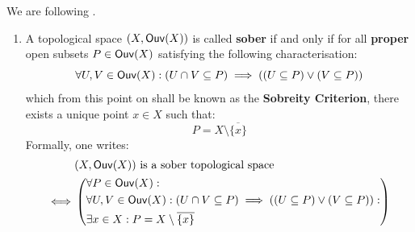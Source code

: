                     \begin{definition} \label{def: sober_spaces}
                        We are following \cite[Definition IX.3.2]{sheaves_in_geometry_and_logic}.
                        \begin{enumerate}
                            \item A topological space $(X, \mathsf{Ouv}(X))$ is called \textbf{sober} if and only if for all \textbf{proper} open subsets $P \in \mathsf{Ouv}(X)$ satisfying the following  characterisation:
                                $$\forall U, V \in \mathsf{Ouv}(X): (U \cap V \subseteq P) \implies \left((U \subseteq P) \vee (V \subseteq P)\right)$$
                            which from this point on shall be known as the \textbf{Sobreity Criterion}, there exists a unique point $x \in X$ such that:
                                $$P = X \setminus \overline{\{x\}}$$
                            Formally, one writes:
                                $$
                                    \begin{aligned}
                                        & \text{$(X, \mathsf{Ouv}(X))$ is a sober topological space}
                                        \\
                                        \iff &
                                            \left(\begin{aligned}
                                                & \forall P \in \mathsf{Ouv}(X):
                                                \\
                                                    & \forall U, V \in \mathsf{Ouv}(X): (U \cap V \subseteq P) \implies \left((U \subseteq P) \vee (V \subseteq P)\right): 
                                                \\
                                                & \exists x \in X: P = X \setminus \overline{\{x\}}
                                            \end{aligned}\right)
                                    \end{aligned}
                                $$
                        \end{enumerate}
                    \end{definition}
                    
